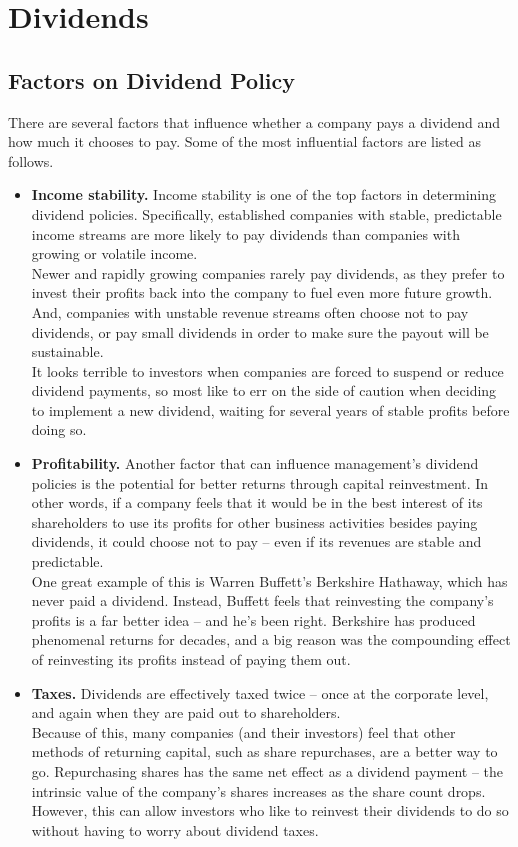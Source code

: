\chapter{Dividends}
\section{Factors on Dividend Policy}
There are several factors that influence whether a company pays a dividend and how much it chooses to pay. Some of the most influential factors are listed as follows.
\begin{itemize}
	\item \textbf{Income stability.} 
	Income stability is one of the top factors in determining dividend policies. Specifically, established companies with stable, predictable income streams are more likely to pay dividends than companies with growing or volatile income.\\
	Newer and rapidly growing companies rarely pay dividends, as they prefer to invest their profits back into the company to fuel even more future growth. And, companies with unstable revenue streams often choose not to pay dividends, or pay small dividends in order to make sure the payout will be sustainable.\\
	It looks terrible to investors when companies are forced to suspend or reduce dividend payments, so most like to err on the side of caution when deciding to implement a new dividend, waiting for several years of stable profits before doing so.	
	
	\item  \textbf{Profitability.}
	Another factor that can influence management's dividend policies is the potential for better returns through capital reinvestment. In other words, if a company feels that it would be in the best interest of its shareholders to use its profits for other business activities besides paying dividends, it could choose not to pay – even if its revenues are stable and predictable.\\
	One great example of this is Warren Buffett's Berkshire Hathaway, which has never paid a dividend. Instead, Buffett feels that reinvesting the company's profits is a far better idea -- and he's been right. Berkshire has produced phenomenal returns for decades, and a big reason was the compounding effect of reinvesting its profits instead of paying them out.
	
	\item \textbf{Taxes.}
	Dividends are effectively taxed twice -- once at the corporate level, and again when they are paid out to shareholders.\\
	Because of this, many companies (and their investors) feel that other methods of returning capital, such as share repurchases, are a better way to go. Repurchasing shares has the same net effect as a dividend payment -- the intrinsic value of the company's shares increases as the share count drops. However, this can allow investors who like to reinvest their dividends to do so without having to worry about dividend taxes.
	

\end{itemize}
